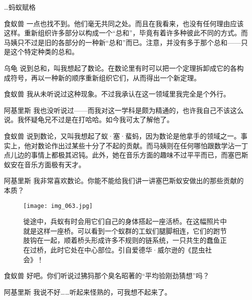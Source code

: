 \begin{dialog}{…蚂蚁赋格}
\begin{dialogue}
\item[食蚁兽]一点也找不到。他们毫无共同之处。而且在我看来，也没有任何理由应该这样。重新组织许多部分以构成一个“总和”，毕竟有着许多种彼此不同的方式。而马姨只不过是旧的各部分的一种新“总和”而已。注意，并没有多于那个总和——只是这个特定种类的总和。

\item[乌龟]说到总和，叫我想起了数论。在数论里有时可以把一个定理拆卸成它的各构成符号，再以一种新的顺序重新组织它们，从而得出一个新定理。

\item[食蚁兽]我从未听说过这种现象。不过我承认在这一领域里我完全是个外行。

\item[阿基里斯]我也没听说过——而我对这一学科是颇为精通的，也许我自己不该这么说。我怀疑龟兄不过是在打哈哈。如今我可太了解他了。

\item[食蚁兽]说到数论，又叫我想起了蚁·塞·蜚蚂，因为数论是他拿手的领域之一。事实上，他对数论作出过某些十分了不起的贡献。而马姨则在任何哪怕跟数学沾一丁点儿边的事情上都极其迟钝。此外，她在音乐方面的趣味不过平平而已，而塞巴斯蚁安在音乐方面极有天才。

\item[阿基里斯]我非常喜欢数论。你能不能给我们讲一讲塞巴斯蚁安做出的那些贡献的本质？

\begin{figure}
\texttt{[image: img\_063.jpg]}
\caption[一座蚁桥的照片。]
  {徙途中，兵蚁有时会用它们自己的身体搭起一座活桥。在这幅照片中就是这样一座桥。可以看到一个蚁群的工蚁们腿脚相连，它们的跗节肢钩在一起，顺着桥头形成许多不规则的链系统，一只共生的蠢鱼正在过桥，此时它处在中心部位。引自爱德华·威尔逊的《昆虫社会》！}
\end{figure}

\item[食蚁兽]好吧。你们听说过狒犸那个臭名昭著的“平均验刚劲猜想”吗？

\item[阿基里斯]我说不好……听起来怪熟的，可我想不起来了。


\end{dialogue}
\end{dialog}
